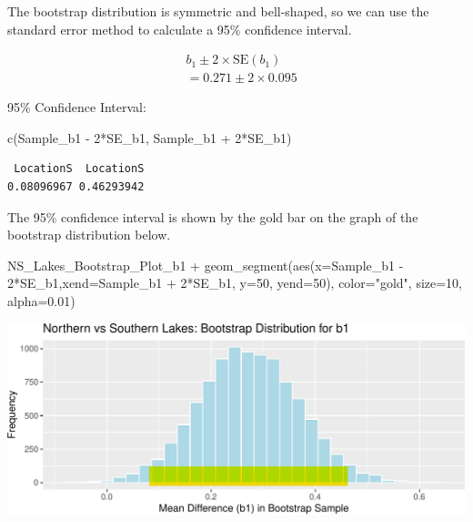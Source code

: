\documentclass[
  letterpaper,
  DIV=11,
  numbers=noendperiod]{scrreprt}
\newenvironment{Shaded}{\begin{snugshade}}{\end{snugshade}}
\newcommand{\AttributeTok}[1]{\textcolor[rgb]{0.40,0.45,0.13}{#1}}
\newcommand{\DecValTok}[1]{\textcolor[rgb]{0.68,0.00,0.00}{#1}}
\newcommand{\FloatTok}[1]{\textcolor[rgb]{0.68,0.00,0.00}{#1}}
\newcommand{\FunctionTok}[1]{\textcolor[rgb]{0.28,0.35,0.67}{#1}}
\newcommand{\NormalTok}[1]{\textcolor[rgb]{0.00,0.23,0.31}{#1}}
\newcommand{\SpecialCharTok}[1]{\textcolor[rgb]{0.37,0.37,0.37}{#1}}
\newcommand{\StringTok}[1]{\textcolor[rgb]{0.13,0.47,0.30}{#1}}
\begin{document}
The bootstrap distribution is symmetric and bell-shaped, so we can use
the standard error method to calculate a 95\% confidence interval.

\[
\begin{aligned}
& b_1 \pm 2\times\text{SE}(b_1) \\
& = 0.271 \pm 2\times{0.095}
\end{aligned}
\]

95\% Confidence Interval:

\begin{Shaded}
\begin{Highlighting}[]
\FunctionTok{c}\NormalTok{(Sample\_b1 }\SpecialCharTok{{-}} \DecValTok{2}\SpecialCharTok{*}\NormalTok{SE\_b1, Sample\_b1 }\SpecialCharTok{+} \DecValTok{2}\SpecialCharTok{*}\NormalTok{SE\_b1) }
\end{Highlighting}
\end{Shaded}

\begin{verbatim}
 LocationS  LocationS 
0.08096967 0.46293942 
\end{verbatim}

The 95\% confidence interval is shown by the gold bar on the graph of
the bootstrap distribution below.

\begin{Shaded}
\begin{Highlighting}[]
\NormalTok{NS\_Lakes\_Bootstrap\_Plot\_b1 }\SpecialCharTok{+} 
  \FunctionTok{geom\_segment}\NormalTok{(}\FunctionTok{aes}\NormalTok{(}\AttributeTok{x=}\NormalTok{Sample\_b1 }\SpecialCharTok{{-}} \DecValTok{2}\SpecialCharTok{*}\NormalTok{SE\_b1,}\AttributeTok{xend=}\NormalTok{Sample\_b1 }\SpecialCharTok{+} \DecValTok{2}\SpecialCharTok{*}\NormalTok{SE\_b1, }\AttributeTok{y=}\DecValTok{50}\NormalTok{, }\AttributeTok{yend=}\DecValTok{50}\NormalTok{), }
               \AttributeTok{color=}\StringTok{"gold"}\NormalTok{, }\AttributeTok{size=}\DecValTok{10}\NormalTok{, }\AttributeTok{alpha=}\FloatTok{0.01}\NormalTok{) }
\end{Highlighting}
\end{Shaded}

\includegraphics{Ch3_files/figure-pdf/unnamed-chunk-114-1.pdf}
\end{document}
